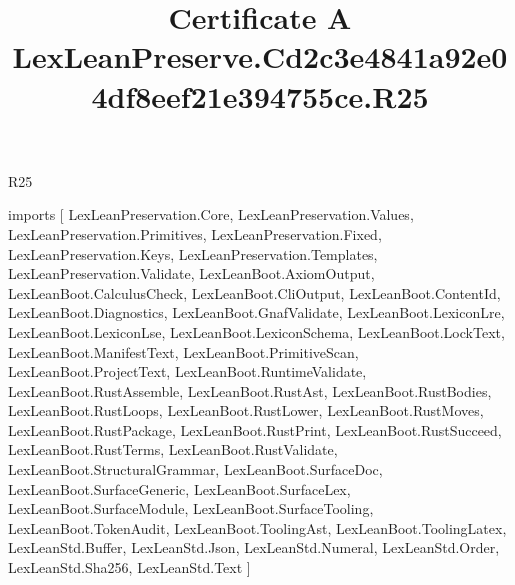 \begin{lexlean}{R25}
\title{Certificate A LexLeanPreserve.Cd2c3e4841a92e04df8eef21e394755ce.R25}
\begin{coremodule}
imports [
  LexLeanPreservation.Core,
  LexLeanPreservation.Values,
  LexLeanPreservation.Primitives,
  LexLeanPreservation.Fixed,
  LexLeanPreservation.Keys,
  LexLeanPreservation.Templates,
  LexLeanPreservation.Validate,
  LexLeanBoot.AxiomOutput,
  LexLeanBoot.CalculusCheck,
  LexLeanBoot.CliOutput,
  LexLeanBoot.ContentId,
  LexLeanBoot.Diagnostics,
  LexLeanBoot.GnafValidate,
  LexLeanBoot.LexiconLre,
  LexLeanBoot.LexiconLse,
  LexLeanBoot.LexiconSchema,
  LexLeanBoot.LockText,
  LexLeanBoot.ManifestText,
  LexLeanBoot.PrimitiveScan,
  LexLeanBoot.ProjectText,
  LexLeanBoot.RuntimeValidate,
  LexLeanBoot.RustAssemble,
  LexLeanBoot.RustAst,
  LexLeanBoot.RustBodies,
  LexLeanBoot.RustLoops,
  LexLeanBoot.RustLower,
  LexLeanBoot.RustMoves,
  LexLeanBoot.RustPackage,
  LexLeanBoot.RustPrint,
  LexLeanBoot.RustSucceed,
  LexLeanBoot.RustTerms,
  LexLeanBoot.RustValidate,
  LexLeanBoot.StructuralGrammar,
  LexLeanBoot.SurfaceDoc,
  LexLeanBoot.SurfaceGeneric,
  LexLeanBoot.SurfaceLex,
  LexLeanBoot.SurfaceModule,
  LexLeanBoot.SurfaceTooling,
  LexLeanBoot.TokenAudit,
  LexLeanBoot.ToolingAst,
  LexLeanBoot.ToolingLatex,
  LexLeanStd.Buffer,
  LexLeanStd.Json,
  LexLeanStd.Numeral,
  LexLeanStd.Order,
  LexLeanStd.Sha256,
  LexLeanStd.Text
]


\end{coremodule}
\end{lexlean}
